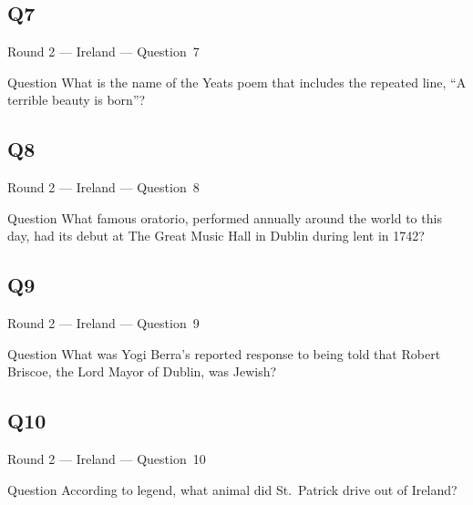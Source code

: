 \documentclass[11pt]{beamer}
\begin{document}
\subsection*{Q7}
\begin{frame}[t]{Round 2 --- Ireland --- \mbox{Question 7}}
\vspace{-0.5em}
\begin{block}{Question}
What  is the name of the Yeats poem that includes the repeated line, ``A terrible beauty is born''?
\end{block}
\end{frame}
\subsection*{Q8}
\begin{frame}[t]{Round 2 --- Ireland --- \mbox{Question 8}}
\vspace{-0.5em}
\begin{block}{Question}
What famous oratorio, performed annually around the world to this day, had its debut at The Great Music Hall in Dublin during lent in 1742? 
\end{block}
\end{frame}
\subsection*{Q9}
\begin{frame}[t]{Round 2 --- Ireland --- \mbox{Question 9}}
\vspace{-0.5em}
\begin{block}{Question}
What was Yogi Berra's reported response to being told that Robert Briscoe, the Lord Mayor of Dublin, was Jewish?
\end{block}
\end{frame}
\subsection*{Q10}
\begin{frame}[t]{Round 2 --- Ireland --- \mbox{Question 10}}
\vspace{-0.5em}
\begin{block}{Question}
According to legend, what animal did St.\ Patrick drive out of Ireland?
\end{block}
\end{frame}
\end{document}
